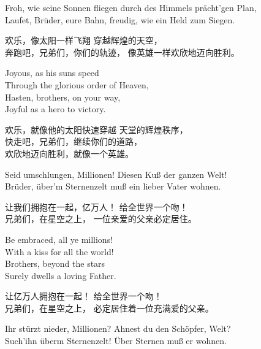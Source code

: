 \begin{paracol}{4}
\begin{Gverse}
Froh, wie seine Sonnen fliegen 
durch des Himmels pr\"acht'gen Plan,\\
Laufet, Br\"uder, eure Bahn,
freudig, wie ein Held zum Siegen. 
\end{Gverse}
\begin{CGverse}
欢乐，像太阳一样飞翔
穿越辉煌的天空，\\
奔跑吧，兄弟们，你们的轨迹，
像英雄一样欢欣地迈向胜利。
\end{CGverse}
\begin{Everse}
Joyous, as his suns speed\\
Through the glorious order of Heaven,\\
Hasten, brothers, on your way,\\
Joyful as a hero to victory.
\end{Everse}
\begin{CEverse}
欢乐，就像他的太阳快速穿越
天堂的辉煌秩序，\\
快走吧，兄弟们，继续你们的道路，\\
欢欣地迈向胜利，就像一个英雄。
\end{CEverse}
\begin{Gverse}
Seid umschlungen, Millionen! 
Diesen Ku{\ss} der ganzen Welt!\\
Br\"uder, \"uber'm Sternenzelt
mu{\ss} ein lieber Vater woh\-nen. 
\end{Gverse}
\begin{CGverse}
让我们拥抱在一起，亿万人！
给全世界一个吻！\\
兄弟们，在星空之上，
一位亲爱的父亲必定居住。
\end{CGverse}
\begin{Everse}
Be embraced, all ye millions!\\
With a kiss for all the world!\\
Brothers, beyond the stars\\
Surely dwells a loving Father. 
\end{Everse}
\begin{CEverse}
让亿万人拥抱在一起！
给全世界一个吻！\\
兄弟们，在星空之上，
必定居住着一位充满爱的父亲。
\end{CEverse}
\begin{Gverse}
Ihr st\"urzt nieder, Millionen?
Ahnest du den Sch\"opfer, Welt?\\
Such'ihn \"uberm Sternenzelt! 
\"Uber Sternen mu{\ss} er wohnen.
\end{Gverse}
\begin{CGverse}

\end{CGverse}
\end{paracol}
